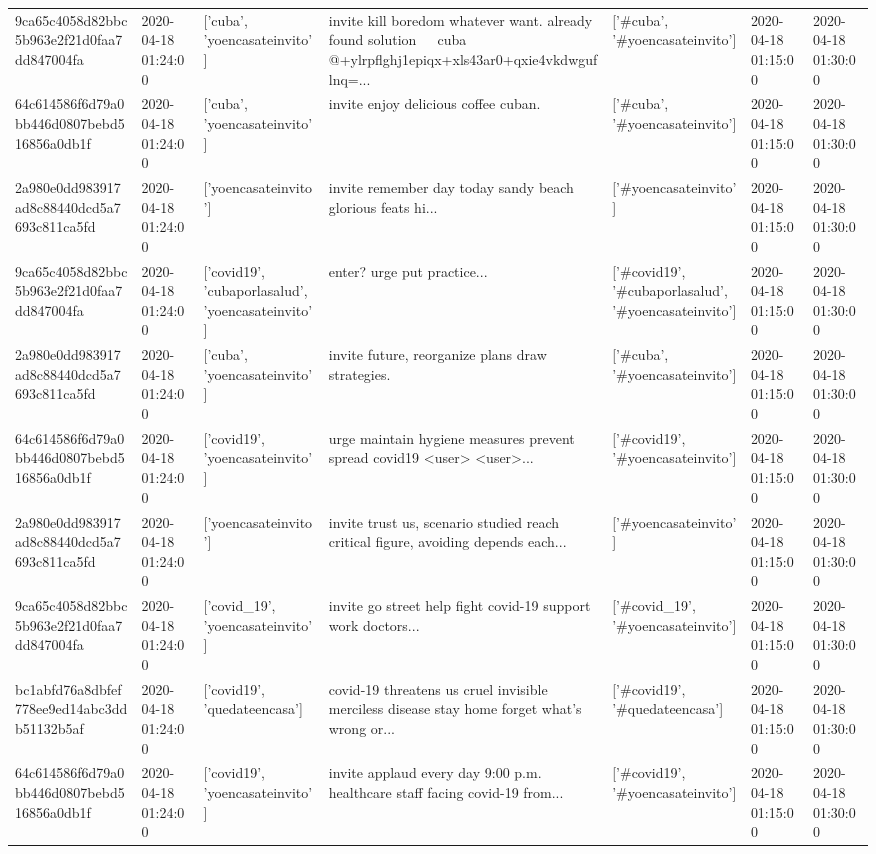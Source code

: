 \begin{tabular}{lllllll}
9ca65c4058d82bbc5b963e2f21d0faa7dd847004fa & 2020-04-18 01:24:00 & ['cuba', 'yoencasateinvito'] & invite kill boredom whatever want. already found solution 🤣🤣🤣 cuba @+ylrpflghj1epiqx+xls43ar0+qxie4vkdwguflnq=... & ['#cuba', '#yoencasateinvito'] & 2020-04-18 01:15:00 & 2020-04-18 01:30:00 \\
64c614586f6d79a0bb446d0807bebd516856a0db1f & 2020-04-18 01:24:00 & ['cuba', 'yoencasateinvito'] & invite enjoy delicious coffee cuban. & ['#cuba', '#yoencasateinvito'] & 2020-04-18 01:15:00 & 2020-04-18 01:30:00 \\
2a980e0dd983917ad8c88440dcd5a7693c811ca5fd & 2020-04-18 01:24:00 & ['yoencasateinvito'] & invite remember day today sandy beach glorious feats hi... & ['#yoencasateinvito'] & 2020-04-18 01:15:00 & 2020-04-18 01:30:00 \\
9ca65c4058d82bbc5b963e2f21d0faa7dd847004fa & 2020-04-18 01:24:00 & ['covid19', 'cubaporlasalud', 'yoencasateinvito'] & enter? urge put practice... & ['#covid19', '#cubaporlasalud', '#yoencasateinvito'] & 2020-04-18 01:15:00 & 2020-04-18 01:30:00 \\
2a980e0dd983917ad8c88440dcd5a7693c811ca5fd & 2020-04-18 01:24:00 & ['cuba', 'yoencasateinvito'] & invite future, reorganize plans draw strategies. & ['#cuba', '#yoencasateinvito'] & 2020-04-18 01:15:00 & 2020-04-18 01:30:00 \\
64c614586f6d79a0bb446d0807bebd516856a0db1f & 2020-04-18 01:24:00 & ['covid19', 'yoencasateinvito'] & urge maintain hygiene measures prevent spread covid19 <user> <user>... & ['#covid19', '#yoencasateinvito'] & 2020-04-18 01:15:00 & 2020-04-18 01:30:00 \\
2a980e0dd983917ad8c88440dcd5a7693c811ca5fd & 2020-04-18 01:24:00 & ['yoencasateinvito'] & invite trust us, scenario studied reach critical figure, avoiding depends each... & ['#yoencasateinvito'] & 2020-04-18 01:15:00 & 2020-04-18 01:30:00 \\
9ca65c4058d82bbc5b963e2f21d0faa7dd847004fa & 2020-04-18 01:24:00 & ['covid_19', 'yoencasateinvito'] & invite go street help fight covid-19 support work doctors... & ['#covid_19', '#yoencasateinvito'] & 2020-04-18 01:15:00 & 2020-04-18 01:30:00 \\
bc1abfd76a8dbfef778ee9ed14abc3ddb51132b5af & 2020-04-18 01:24:00 & ['covid19', 'quedateencasa'] & covid-19 threatens us cruel invisible merciless disease stay home forget what's wrong or... & ['#covid19', '#quedateencasa'] & 2020-04-18 01:15:00 & 2020-04-18 01:30:00 \\
64c614586f6d79a0bb446d0807bebd516856a0db1f & 2020-04-18 01:24:00 & ['covid19', 'yoencasateinvito'] & invite applaud every day 9:00 p.m. healthcare staff facing covid-19 from... & ['#covid19', '#yoencasateinvito'] & 2020-04-18 01:15:00 & 2020-04-18 01:30:00 \\

\end{tabular}
